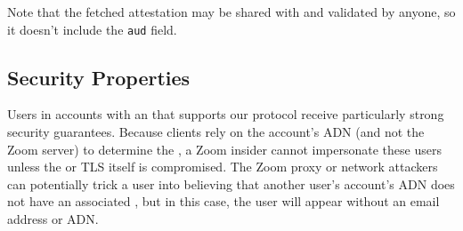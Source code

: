 Note that the fetched attestation may be shared with and validated by anyone, so it doesn't include
the \texttt{aud} field.

\subsection{Security Properties}

Users in accounts with an \idp that supports our protocol receive particularly strong security
guarantees. Because clients rely on the account's ADN (and not the Zoom server) to determine the
\idp, a Zoom insider cannot impersonate these users unless the \idp or TLS itself is compromised.
The Zoom proxy or network attackers can potentially trick a user into believing that another user's
account's ADN does not have an associated \idp, but in this case, the user will appear without an
email address or ADN.
